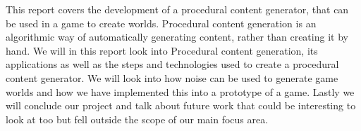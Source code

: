 This report covers the development of a procedural content generator, that can be used in a game to create worlds. Procedural content generation is an algorithmic way of automatically generating content, rather than creating it by hand. We will in this report look into Procedural content generation, its applications as well as the steps and technologies used to create a procedural content generator. We will look into how noise can be used to generate game worlds and how we have implemented this into a prototype of a game. Lastly we will conclude our project and talk about future work that could be interesting to look at too but fell outside the scope of our main focus area.